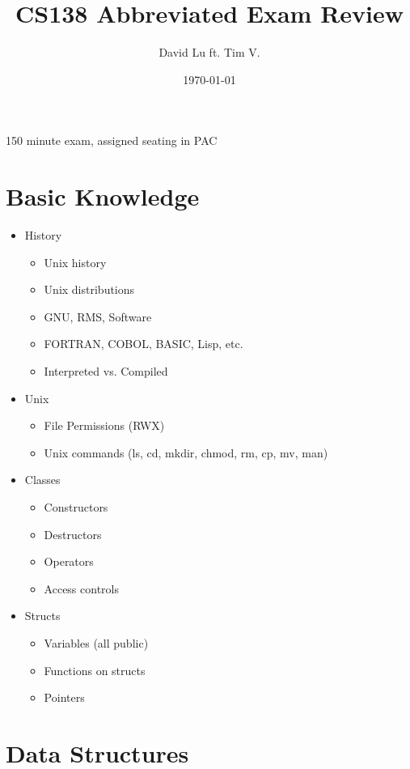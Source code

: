 \documentclass{article}
\begin{document}
\title{CS138 Abbreviated Exam Review}
\date{\today}
\author{David Lu ft. Tim V.}

\maketitle

150 minute exam, assigned seating in PAC

\begin{multicols}{2}
\section{Basic Knowledge}

\begin{itemize}
	\item{History}
	\begin{itemize}
		\item{Unix history}
		\item{Unix distributions}
		\item{GNU, RMS, Software}
		\item{FORTRAN, COBOL, BASIC, Lisp, etc.}
		\item{Interpreted vs. Compiled}
	\end{itemize}
	\item{Unix}
	\begin{itemize}
		\item{File Permissions (RWX)}
		\item{Unix commands (ls, cd, mkdir, chmod, rm, cp, mv, man)}
	\end{itemize}
	\item{Classes}
	\begin{itemize}
		\item{Constructors}
		\item{Destructors}
		\item{Operators}
		\item{Access controls}
	\end{itemize}
	\item{Structs}
	\begin{itemize}
		\item{Variables (all public)}
		\item{Functions on structs}
		\item{Pointers}
	\end{itemize}
\end{itemize}

\section{Data Structures}


\end{multicols}
\end{document}
